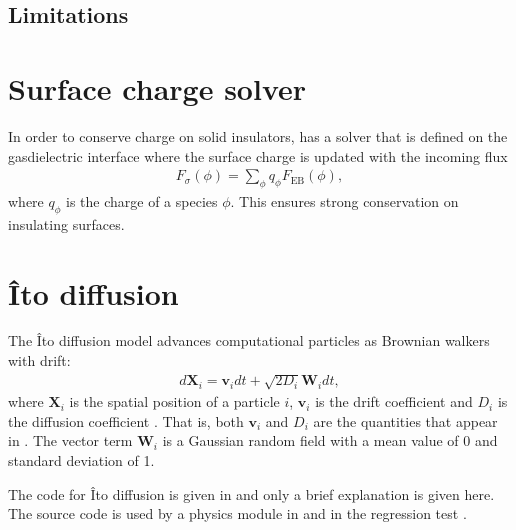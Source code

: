 \documentclass[letterpaper,10pt,english]{sphinxmanual}
\begin{document}
\subsection{Limitations}
\label{\detokenize{RTE:limitations}}

\section{Surface charge solver}
\label{\detokenize{Sigma:surface-charge-solver}}\label{\detokenize{Sigma:chap-sigmasolver}}\label{\detokenize{Sigma::doc}}
In order to conserve charge on solid insulators,  has a solver that is defined on the gas\sphinxhyphen{}dielectric interface where the surface charge is updated with the incoming flux
\begin{equation*}
\begin{split}F_\sigma(\phi) = \sum_{\phi}q_\phi F_{\textrm{EB}}(\phi),\end{split}
\end{equation*}
where \(q_\phi\) is the charge of a species \(\phi\). This ensures strong conservation on insulating surfaces.


\section{Îto diffusion}
\label{\detokenize{Ito:ito-diffusion}}\label{\detokenize{Ito:chap-itodiffusion}}\label{\detokenize{Ito::doc}}
The Îto diffusion model advances computational particles as Brownian walkers with drift:
\begin{equation*}
\begin{split}d\mathbf{X}_i = \mathbf{v}_idt + \sqrt{2D_i}\mathbf{W}_i dt,\end{split}
\end{equation*}
where \(\mathbf{X}_i\) is the spatial position of a particle \(i\), \(\mathbf{v}_i\) is the drift coefficient and \(D_i\) is the diffusion coefficient .
That is, both \(\mathbf{v}_i\) and \(D_i\) are the quantities that appear in {\hyperref[\detokenize{CDR:chap-cdr}]{}}.
The vector term \(\mathbf{W}_i\) is a Gaussian random field with a mean value of 0 and standard deviation of 1.

The code for Îto diffusion is given in  and only a brief explanation is given here.
The source code is used by a physics module in  and in the regression test .
\end{document}
